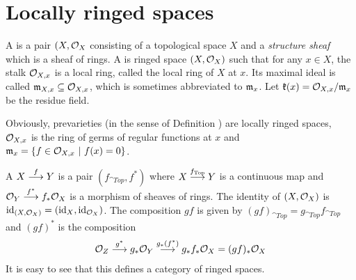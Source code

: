 \documentclass[a4paper,parskip=half,numbers=enddot, DIV=12]{scrreprt}
\begin{document}
\section{Locally ringed spaces}
\begin{defi}
    A  is a pair $(X,\mathcal{O}_X$ consisting of a topological space $X$ and a \emph{structure sheaf} which is a sheaf of rings. A  is ringed space $(X,\mathcal{O}_X)$ such that for any $x\in X$, the stalk $\mathcal{O}_{X,x}$ is a local ring, called the local ring of $X$ at $x$. Its maximal ideal is called $\mathfrak{m}_{X,x}\subseteq \mathcal{O}_{X,x}$, which is sometimes abbreviated to $\mathfrak{m}_x$. Let $\mathfrak{k}(x) = \mathcal{O}_{X,x}/\mathfrak{m}_x$ be the residue field.
\end{defi}
\begin{rem}
    Obviously, prevarieties (in the sense of Definition ) are locally ringed spaces, $\mathcal{O}_{X,x}$ is the ring of germs of regular functions at $x$ and $\mathfrak{m}_x = \left\{f\in \mathcal{O}_{X,x} \ \middle|\  f(x) = 0 \right\}$.
\end{rem}
\begin{defi} 
    A  $X\morphism[f] Y$ is a pair $(f_{\cat{Top}}, f^*)$ where $X\morphism[f_{\cat{Top}}] Y$ is a continuous map and $\Oo_Y \morphism[f^*] f_*\Oo_X$ is a morphism of sheaves of rings. The identity of $(X,\mathcal{O}_X)$ is $\operatorname{id}_{(X,\mathcal{O}_X)} = (\operatorname{id}_X, \operatorname{id}_{\mathcal{O}_X})$. The composition $gf$ is given by $(gf)_{\cat{Top}} = g_{\cat{Top}} f_{\cat{Top}}$ and $(gf)^*$ is the composition 
    \begin{align*}
        \Oo_Z \morphism[g^*] g_*\Oo_Y \morphism[g_*(f^*)] g_*f_*\Oo_X = (gf)_*\Oo_X
    \end{align*} 
    It is easy to see that this defines a category of ringed spaces.
\end{defi}
\end{document}
